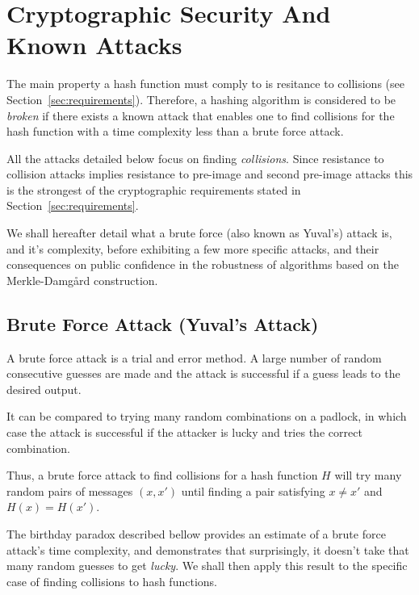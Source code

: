 \chapter{Cryptographic Security And Known Attacks}
The main property a hash function must comply to is resitance to collisions (see Section~\ref{sec:requirements}). Therefore, a hashing algorithm is considered to be \emph{broken} if there exists a known attack that enables one to find collisions for the hash function with a time complexity less than a brute force attack.

All the attacks detailed below focus on finding \emph{collisions}. Since resistance to collision attacks implies resistance to pre-image and second pre-image attacks this is the strongest of the cryptographic requirements stated in Section~\ref{sec:requirements}.

We shall hereafter detail what a brute force (also known as Yuval's) attack is, and it's complexity, before exhibiting a few more specific attacks, and their consequences on public confidence in the robustness of algorithms based on the Merkle-Damg\r{a}rd construction.

\section{Brute Force Attack (Yuval's Attack)}
A brute force attack is a trial and error method. A large number of random consecutive guesses are made and the attack is successful if a guess leads to the desired output.

It can be compared to trying many random combinations on a padlock, in which case the attack is successful if the attacker is lucky and tries the correct combination.

Thus, a brute force attack to find collisions for a hash function $H$ will try many random pairs of messages $ (x,x')$ until finding a pair satisfying $x\ne x' $ and $H(x) = H(x')$.

The birthday paradox described bellow provides an estimate of a brute force attack's time complexity, and demonstrates that surprisingly, it doesn't take that many random guesses to get \emph{lucky}. We shall then apply this result to the specific case of finding collisions to hash functions.

